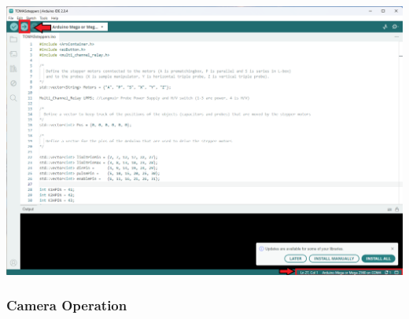 \documentclass[fleqn,a4paper,20pt]{article}
\begin{document}
\begin{minipage}{.02\textwidth}
$\ $\\
\end{minipage}

\begin{minipage}{\textwidth}
\includegraphics[width=\linewidth]{Arduino2}
\label{Arduino2}
\end{minipage}

\newpage



\subsubsection{Camera Operation}
\end{document}
